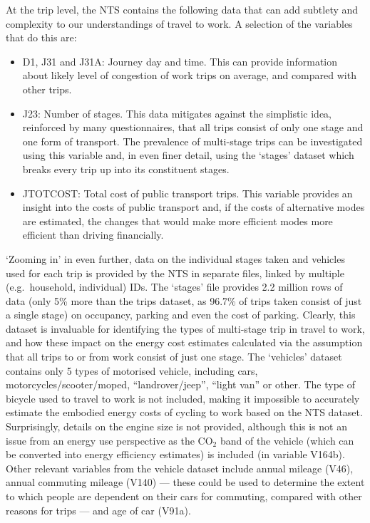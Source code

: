 At the trip level, the NTS contains the following data that can add subtlety
and complexity to our understandings of travel to work. A selection of the
variables that do this are:
\begin{itemize}
 \item D1, J31 and J31A: Journey day and time. This can provide information
about likely level of congestion of work trips on average, and compared with
other trips.
 \item J23: Number of stages. This data mitigates against the simplistic idea,
reinforced by many questionnaires, that all trips consist of only one stage and
one form of transport. The prevalence of multi-stage trips can be investigated
using this variable and, in even finer detail, using the `stages' dataset which
breaks every trip up into its constituent stages.	
 \item JTOTCOST: Total cost of public transport trips. This variable provides
an insight into the costs of public transport and, if the costs of alternative
modes are estimated, the changes that would make more efficient modes more
efficient than driving financially. 
\end{itemize}

`Zooming in' in even further, data on the individual stages taken and vehicles
used for each trip is provided by the NTS in separate files, linked by multiple
(e.g.~household, individual) IDs. The `stages' file 
provides 2.2 million rows of data (only 5\% more than the trips dataset, as
96.7\% of trips taken consist of just a single stage) on occupancy, parking and
even the cost of parking. Clearly, this dataset is invaluable for identifying
the types of multi-stage trip in travel to work, and how these impact on the
energy cost estimates calculated via the assumption that all trips to or from
work consist of just one stage. The `vehicles' dataset contains only 5 types of 
motorised vehicle, including cars, motorcycles/scooter/moped,
``landrover/jeep'', ``light van'' or other. The type of bicycle used to travel
to work is not included, making it impossible to accurately estimate the
embodied energy costs of cycling to work based on the NTS dataset.
Surprisingly, details on the engine size is not provided, although this is not
an issue from an energy use perspective as the CO$_{2}$ band of the vehicle
(which can be converted into energy efficiency estimates) %
is included (in variable V164b). Other relevant variables from the vehicle
dataset include annual mileage (V46), annual commuting mileage (V140) --- these
could be used to determine the extent to which people are dependent on their
cars for commuting, compared with other reasons for trips --- and age of car
(V91a).

